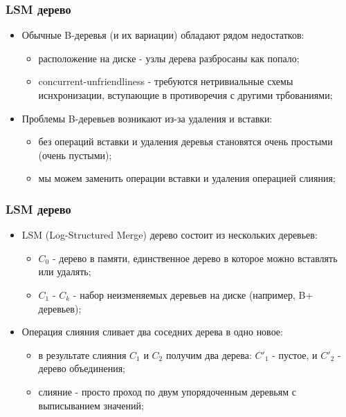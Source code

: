 \begin{frame}
\frametitle{LSM дерево}
\begin{itemize}
  \item<1-> Обычные B-деревья (и их вариации) обладают рядом недостатков:
    \begin{itemize}
      \item расположение на диске - узлы дерева разбросаны как попало;
      \item concurrent-unfriendliness - требуются нетривиальные схемы иснхронизации, вступающие в противоречия с другими трбованиями;
    \end{itemize}
  \item<2-> Проблемы B-деревьев возникают из-за удаления и вставки:
    \begin{itemize}
      \item без операций вставки и удаления деревья становятся очень простыми (очень пустыми);
      \item мы можем заменить операции вставки и удаления операцией слияния;
    \end{itemize}
\end{itemize}
\end{frame}

\begin{frame}
\frametitle{LSM дерево}
\begin{itemize}
  \item<1-> LSM (Log-Structured Merge) дерево состоит из нескольких деревьев:
    \begin{itemize}
      \item $C_0$ - дерево в памяти, единственное дерево в которое можно вставлять или удалять;
      \item $C_1$ - $C_k$ - набор неизменяемых деревьев на диске (например, B+ деревьев);
    \end{itemize}
  \item<2-> Операция слияния сливает два соседних дерева в одно новое:
    \begin{itemize}
      \item в результате слияния $C_1$ и $C_2$ получим два дерева: $C'_1$ - пустое, и $C'_2$ - дерево объединения;
      \item слияние - просто проход по двум упорядоченным деревьям с выписыванием значений;
    \end{itemize}
\end{itemize}
\end{frame}

